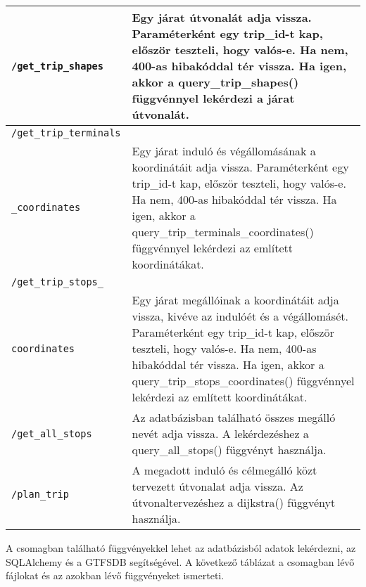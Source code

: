 \begin{longtable}{|p{4.5cm}|p{9cm}|}
\hline
\texttt{/get\_trip\_shapes} &
Egy járat útvonalát adja vissza. Paraméterként egy trip\_id-t kap, először teszteli, hogy valós-e. Ha nem, 400-as hibakóddal tér vissza. Ha igen, akkor a query\_trip\_shapes() függvénnyel lekérdezi a járat útvonalát. \\
\hline
\texttt{/get\_trip\_terminals} \\ \texttt{\_coordinates} &
Egy járat induló és végállomásának a koordinátáit adja vissza. Paraméterként egy trip\_id-t kap, először teszteli, hogy valós-e. Ha nem, 400-as hibakóddal tér vissza. Ha igen, akkor a query\_trip\_terminals\_coordinates() függvénnyel lekérdezi az említett koordinátákat. \\
\hline
\texttt{/get\_trip\_stops\_} \\ \texttt{coordinates} &
Egy járat megállóinak a koordinátáit adja vissza, kivéve az indulóét és a végállomásét. Paraméterként egy trip\_id-t kap, először teszteli, hogy valós-e. Ha nem, 400-as hibakóddal tér vissza. Ha igen, akkor a query\_trip\_stops\_coordinates() függvénnyel lekérdezi az említett koordinátákat. \\
\hline
\texttt{/get\_all\_stops} &
Az adatbázisban található összes megálló nevét adja vissza. A lekérdezéshez a query\_all\_stops() függvényt használja. \\
\hline
\texttt{/plan\_trip} &
A megadott induló és célmegálló közt tervezett útvonalat adja vissza. Az útvonaltervezéshez a dijkstra() függvényt használja. \\
\hline
\end{longtable}


A csomagban található függvényekkel lehet az adatbázisból adatok lekérdezni, az SQLAlchemy és a GTFSDB segítségével. A következő táblázat a csomagban lévő fájlokat és az azokban lévő függvényeket ismerteti.

